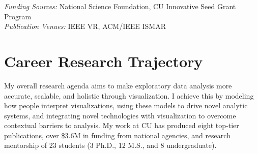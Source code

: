 \documentclass[11pt]{article}
\begin{document}


\emph{Funding Sources:} National Science Foundation, CU Innovative Seed Grant Program\\
\emph{Publication Venues:} IEEE VR, ACM/IEEE ISMAR

\section*{Career Research Trajectory}

My overall research agenda aims to 
make exploratory data analysis more accurate, scalable, and holistic through visualization. I achieve this by modeling how people interpret visualizations, using these models to drive novel analytic systems, and integrating novel technologies with visualization to overcome contextual barriers to analysis. My work at CU has produced eight top-tier publications, over \$3.6M in funding from national agencies, and research mentorship of 23 students (3 Ph.D., 12 M.S., and 8 undergraduate). 
\end{document}
